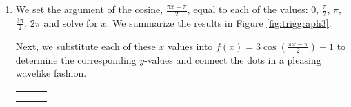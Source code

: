 {
\begin{enumerate}

\item  We set the argument of the cosine, $\frac{\pi x - \pi}{2}$, equal to each of the values:  $0$, $\frac{\pi}{2}$, $\pi$, $\frac{3\pi}{2}$, $2\pi$ and solve for $x$. We summarize the results in Figure \ref{fig:triggraph3}.


Next, we substitute each of these $x$ values into $f(x) = 3 \cos\left(\frac{\pi x - \pi}{2}\right) + 1$ to determine the corresponding $y$-values and connect the dots in a pleasing wavelike fashion. 

\medskip

\noindent\hskip-30pt\begin{minipage}{\textwidth}
\begin{center}
\begin{tabular}{m{} m{}}
\setlength{\extrarowheight}{2pt}
\[ \begin{array}{|r||r|r|}  


\end{array}\]
\end{tabular}
\end{center}
\end{minipage}
\end{enumerate}}
